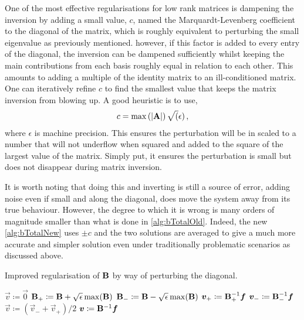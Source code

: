 One of the most effective regularisations for low rank matrices is dampening the inversion by adding a small value, $c$, named the Marquardt-Levenberg coefficient to the diagonal of the matrix, which is roughly equivalent to perturbing the small eigenvalue as previously mentioned. however, if this factor is added to every entry of the diagonal, the inversion can be dampened sufficiently whilst keeping the main contributions from each basis roughly equal in relation to each other. This amounts to adding a multiple of the identity matrix to an ill-conditioned matrix. One can iteratively refine $c$ to find the smallest value that keeps the matrix inversion from blowing up. A good heuristic is to use,
\begin{align}\label{eq:marquardt}
    c = \max\left(\lvert\mathbf{A}\rvert\right) \sqrt(\epsilon)\,,
\end{align}
where $\epsilon$ is machine precision. This ensures the perturbation will be in scaled to a number that will not underflow when squared and added to the square of the largest value of the matrix. Simply put, it ensures the perturbation is small but does not disappear during matrix inversion.

It is worth noting that doing this and inverting is still a source of error, adding noise even if small and along the diagonal, does move the system away from its true behaviour. However, the degree to which it is wrong is many orders of magnitude smaller than what is done in \cref{alg:bTotalOld}. Indeed, the new \cref{alg:bTotalNew} uses $\pm c $ and the two solutions are averaged to give a much more accurate and simpler solution even under traditionally problematic scenarios as discussed above.
\begin{algorithm}
    \caption{Improved regularisation of $\mathbf{B}$ by way of perturbing the diagonal.}
    \label{alg:bTotalNew}
    \begin{algorithmic}
        \State $\vec{v} \coloneqq \vec{0}$
        \State $\mathbf{B}_+ \coloneqq \mathbf{B} + \sqrt{\epsilon} \max(\mathbf{B})$
        \State $\mathbf{B}_- \coloneqq \mathbf{B} - \sqrt{\epsilon} \max(\mathbf{B})$
        \State $\vec{v}_+ \coloneqq \mtx{B}_+^{-1} \vec{f}$
        \State $\vec{v}_- \coloneqq \mtx{B}_-^{-1} \vec{f}$
        \State $\vec{v} \coloneqq (\vec{v}_- + \vec{v}_+)/2$
        \Else
        \State $\vec{v} \coloneqq \mtx{B}^{-1} \vec{f}$
        \EndIf
    \end{algorithmic}
\end{algorithm}

